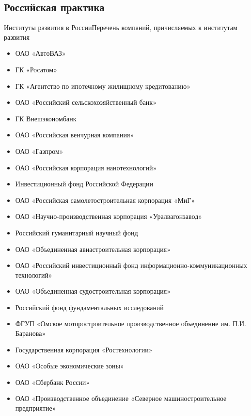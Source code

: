 \documentclass[_Venture_p3.tex]{subfiles}
\begin{document}
\subsection{Российская практика}
\begin{frame}[allowframebreaks]{Институты развития в России}{Перечень компаний, причисляемых к институтам развития}
\begin{itemize}
	\item ОАО «АвтоВАЗ»
	\item ГК «Росатом»
	\item ГК «Агентство по ипотечному  жилищному кредитованию»
	\item ОАО «Российский сельскохозяйственный банк» 
	
	\pagebreak
	\item ГК Внешэкономбанк
	\item ОАО «Российская венчурная компания»
	\item ОАО «Газпром»
	\item ОАО «Российская корпорация нанотехнологий» 
	
	\pagebreak
	\item Инвестиционный фонд Российской Федерации
	\item ОАО «Российская самолетостроительная корпорация «МиГ»
	\item ОАО «Научно-производственная корпорация «Уралвагонзавод» 
	
	\pagebreak
	\item Российский гуманитарный научный фонд 
	\item ОАО «Объединенная авиастроительная корпорация»
	\item ОАО «Российский инвестиционный фонд информационно-коммуникационных технологий»
	
	\pagebreak
	\item ОАО «Объединенная судостроительная корпорация»
	\item Российский фонд фундаментальных исследований
	\item ФГУП «Омское моторостроительное производственное объединение им. П.И. Баранова»

	\pagebreak
	\item Государственная корпорация «Ростехнологии»
	\item ОАО «Особые экономические зоны» 
	\item ОАО «Сбербанк России» 
	\item ОАО «Производственное объединение «Северное машиностроительное предприятие»


\end{itemize}
\end{frame}
\end{document}
